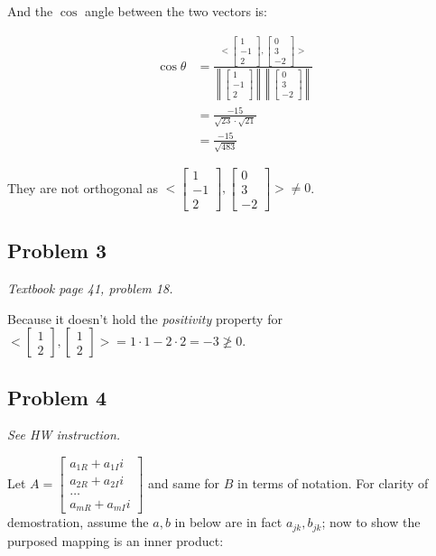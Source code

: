 \documentclass[11pt]{article}
\providecommand{\qbm}[1]{\begin{bmatrix} #1 \end{bmatrix}}
\providecommand{\norm}[1]{\left\lVert #1 \right\rVert}
\begin{document}
And the $\cos$ angle between the two vectors is:

\begin{align*}
    \cos \theta &= \frac{<\qbm{1 \\ -1 \\ 2}, \qbm{0 \\ 3 \\ -2}> }{\norm{\qbm{1 \\ -1 \\ 2}} \norm{\qbm{0 \\ 3 \\ -2}}} \\
    &= \frac{-15}{\sqrt{23} \cdot \sqrt{21}} \\
    &= \frac{-15}{\sqrt{483}}
\end{align*}

They are not orthogonal as $<\qbm{1 \\ -1 \\ 2}, \qbm{0 \\ 3 \\ -2}> \neq 0$.

\subsection*{Problem 3}
\textit{Textbook page 41, problem 18.}\newline

Because it doesn't hold the \textit{positivity} property for $<\qbm{1 \\2}, \qbm{1 \\2}> = 1 \cdot 1 - 2 \cdot 2 = -3 \not \geq 0$.

\subsection*{Problem 4}
\textit{See HW instruction.}\newline

Let $A = \qbm{a_{1R} + a_{1I} i \\ a_{2R} + a_{2I} i \\ \dots \\ a_{mR} + a_{mI} i}$ and same for $B$ in terms of notation. For clarity of demostration, assume the $a, b$ in below are in fact $a_{jk}, b_{jk}$; now to show the purposed mapping is an inner product:
\end{document}
